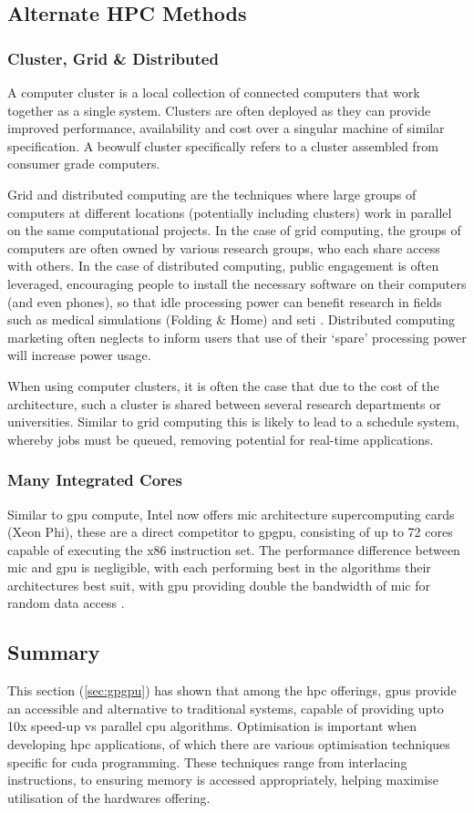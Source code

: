     \subsection{Alternate HPC Methods}
      \subsubsection*{Cluster, Grid \& Distributed}
        A computer cluster is a local collection of connected computers that work together as a single system. Clusters are often deployed as they can provide improved performance, availability and cost over a singular machine of similar specification. A beowulf cluster specifically refers to a cluster assembled from consumer grade computers.

        Grid and distributed computing are the techniques where large groups of computers at different locations (potentially including clusters) work in parallel on the same computational projects. In the case of grid computing, the groups of computers are often owned by various research groups, who each share access with others. In the case of distributed computing, public engagement is often leveraged, encouraging people to install the necessary software on their computers (and even phones), so that idle processing power can benefit research in fields such as medical simulations (Folding \& Home) and \gls{seti} \cite{And04}. Distributed computing marketing often neglects to inform users that use of their `spare' processing power will increase power usage.

        When using computer clusters, it is often the case that due to the cost of the architecture, such a cluster is shared between several research departments or universities. Similar to grid computing this is likely to lead to a schedule system, whereby jobs must be queued, removing potential for real-time applications.

      \subsubsection*{Many Integrated Cores}
        Similar to \gls{gpu} compute, Intel now offers \gls{mic} architecture supercomputing cards (Xeon Phi), these are a direct competitor to \gls{gpgpu}, consisting of up to 72 cores capable of executing the x86 instruction set. The performance difference between \gls{mic} and \gls{gpu} is negligible, with each performing best in the algorithms their architectures best suit, with \gls{gpu} providing double the bandwidth of \gls{mic} for random data access \cite{TK*13}.
    \subsection{Summary}
      This section (\ref{sec:gpgpu}) has shown that among the \gls{hpc} offerings, \glspl{gpu} provide an accessible and alternative to traditional systems, capable of providing upto 10x speed-up vs parallel \gls{cpu} algorithms. Optimisation is important when developing \gls{hpc} applications, of which there are various optimisation techniques specific for \gls{cuda} programming. These techniques range from interlacing instructions, to ensuring memory is accessed appropriately, helping maximise utilisation of the hardwares offering.